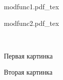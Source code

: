 \documentclass[12pt,a4paper]{article}
\newcommand{\incfig}[1]{%
    \def\svgwidth{\columnwidth}
    {#1.pdf_tex}
}
\begin{document}
\begin{figure}[ht]
	\begin{minipage}[c][\totalheight][c]{0.45\columnwidth}
	\incfig{modfunc1}
	\end{minipage}
	\hfill
	\begin{minipage}[c][\totalheight][c]{0.45\columnwidth}
	\incfig{modfunc2}
	\end{minipage}
	\\
	\begin{minipage}[c][\totalheight][c]{0.45\columnwidth}
    \caption{Первая картинка}
	\label{fig:modfunc1}
	\end{minipage}
	\hfill
	\begin{minipage}[c][\totalheight][c]{0.45\columnwidth}
    \caption{Вторая картинка}
	\label{fig:modfunc2}
	\end{minipage}
\end{figure}
\end{document}
